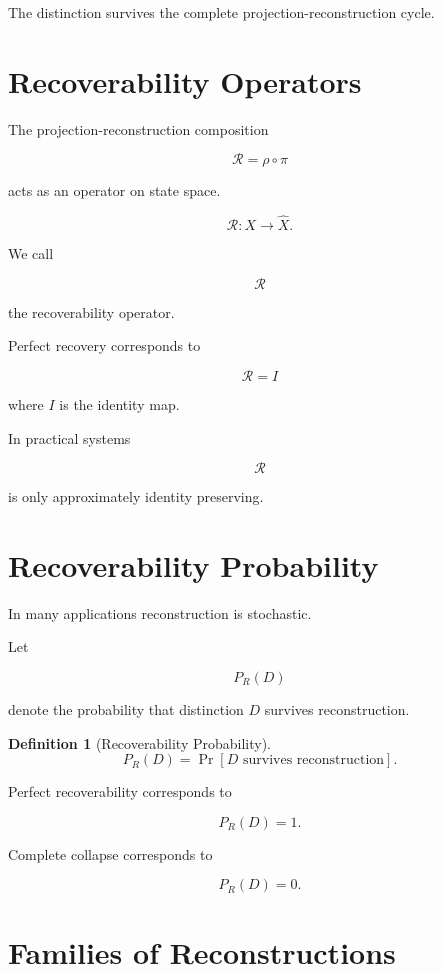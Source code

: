 \documentclass[11pt,oneside,openany]{book}
\newtheorem{definition}{Definition}[chapter] \newtheorem{theorem}{Theorem}[chapter] \newtheorem{proposition}{Proposition}[chapter] \newtheorem{lemma}{Lemma}[chapter] \newtheorem{corollary}{Corollary}[chapter] \newtheorem{remark}{Remark}[chapter]
\begin{document}
The distinction survives the complete projection-reconstruction cycle.

\section{Recoverability Operators}

The projection-reconstruction composition

\[
\mathcal R
=
\rho\circ\pi
\]

acts as an operator on state space.

\[
\mathcal R:X\rightarrow \hat X.
\]

We call

\[
\mathcal R
\]

the recoverability operator.

Perfect recovery corresponds to

\[
\mathcal R=I
\]

where \(I\) is the identity map.

In practical systems

\[
\mathcal R
\]

is only approximately identity preserving.

\section{Recoverability Probability}

In many applications reconstruction is stochastic.

Let

\[
P_R(D)
\]

denote the probability that distinction \(D\) survives reconstruction.

\begin{definition}[Recoverability Probability]

\[
P_R(D)
=
\Pr
\left[
D
\text{ survives reconstruction}
\right].
\]

\end{definition}

Perfect recoverability corresponds to

\[
P_R(D)=1.
\]

Complete collapse corresponds to

\[
P_R(D)=0.
\]

\section{Families of Reconstructions}
\end{document}
